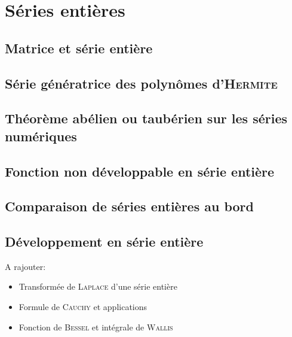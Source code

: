\chapter{Séries entières}

\section{Matrice et série entière}


\section{Série génératrice des polynômes d'\textsc{Hermite}}


\section{Théorème abélien ou taubérien sur les séries numériques}


\section{Fonction non développable en série entière}


\section{Comparaison de séries entières au bord}


\section{Développement en série entière}


A rajouter:
\begin{itemize}
    \item Transformée de \textsc{Laplace} d'une série entière
    \item Formule de \textsc{Cauchy} et applications
    \item Fonction de \textsc{Bessel} et intégrale de \textsc{Wallis}
\end{itemize}

